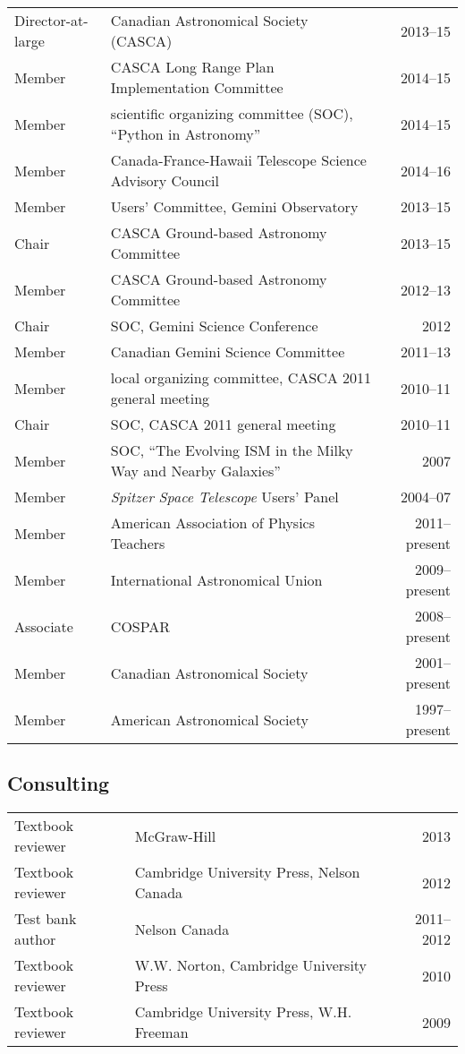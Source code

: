 \documentclass[12pt]{article}
\begin{document}
\vspace{0.5cm}
\begin{tabularx}{\textwidth}{lXr}
Director-at-large& Canadian Astronomical Society (CASCA)& 2013--15\\
Member& CASCA Long Range Plan Implementation Committee& 2014--15\\
Member& scientific organizing committee (SOC), ``Python in Astronomy'' & 2014--15\\
Member& Canada-France-Hawaii Telescope Science Advisory Council& 2014--16\\
Member&  Users' Committee, Gemini Observatory& 2013--15\\
Chair& CASCA Ground-based Astronomy Committee& 2013--15\\
Member& CASCA Ground-based Astronomy Committee& 2012--13\\
Chair& SOC, Gemini Science Conference& 2012\\
Member& Canadian Gemini Science Committee& 2011--13\\
Member& local organizing committee, CASCA 2011 general meeting&2010--11\\
Chair& SOC, CASCA 2011 general meeting&2010--11\\
Member& SOC, ``The Evolving ISM in the Milky Way and Nearby Galaxies'' & 2007\\
Member& {\it Spitzer Space Telescope} Users' Panel& 2004--07\\
Member& American Association of Physics Teachers& 2011--present\\
Member& International Astronomical Union& 2009--present\\
Associate& COSPAR& 2008--present\\
Member& Canadian Astronomical Society& 2001--present\\
Member& American Astronomical Society& 1997--present
\end{tabularx}

\subsection{Consulting}
\begin{tabularx}{\textwidth}{lXr}
Textbook reviewer& McGraw-Hill& 2013\\
Textbook reviewer & Cambridge University Press, Nelson Canada&2012\\
Test bank author& Nelson Canada& 2011--2012\\
Textbook reviewer& W.W. Norton, Cambridge University Press& 2010\\
Textbook reviewer& Cambridge University Press, W.H. Freeman& 2009
\end{tabularx}
\end{document}
